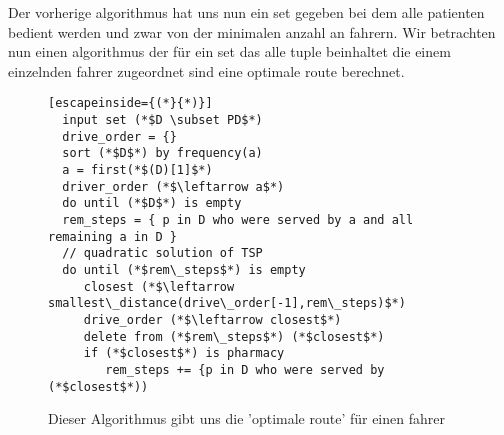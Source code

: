 \documentclass[a4]{article}
\begin{document}
Der vorherige algorithmus hat uns nun ein set gegeben bei dem alle patienten bedient werden und zwar von der minimalen anzahl an fahrern. Wir betrachten nun einen algorithmus der für ein set das alle tuple beinhaltet die einem einzelnden fahrer zugeordnet sind eine optimale route berechnet.

\begin{figure}[h]
\begin{lstlisting}[escapeinside={(*}{*)}]
  input set (*$D \subset PD$*)
  drive_order = {}
  sort (*$D$*) by frequency(a)
  a = first(*$(D)[1]$*)
  driver_order (*$\leftarrow a$*)
  do until (*$D$*) is empty
  rem_steps = { p in D who were served by a and all remaining a in D }
  // quadratic solution of TSP
  do until (*$rem\_steps$*) is empty
     closest (*$\leftarrow smallest\_distance(drive\_order[-1],rem\_steps)$*)
     drive_order (*$\leftarrow closest$*)
     delete from (*$rem\_steps$*) (*$closest$*)
     if (*$closest$*) is pharmacy
        rem_steps += {p in D who were served by (*$closest$*))
\end{lstlisting}
\caption{Dieser Algorithmus gibt uns die 'optimale route' für einen fahrer}
\end{figure}
\end{document}
